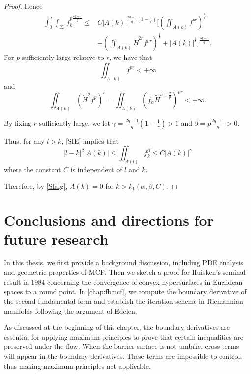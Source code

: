 \begin{proof}
    Hence
    \begin{equation*}
    \begin{split}
        \int_{0}^{T} \int_{\Sigma_t} f_{k}^{p \frac{2q-1}{q}} \leq &C \left| A(k) \right| ^{\frac{2q-1}{q}\left( 1-\frac{1}{r} \right) } [ \left( \iint_{A(k)}^{}f_{}^{pr}  \right) ^{\frac{1}{r}} \\
        &+ \left( \iint_{A(k)}^{}\tilde{H}^{2r} f_{}^{pr }  \right) ^{\frac{1}{r}}+\left| A(k) \right| ^{\frac{1}{r}} ] ^{\frac{2q-1}{q}}.
    \end{split}
    \end{equation*} 
    For $p$ sufficiently large relative to $r$, we have that 
    \[\iint_{A(k)}^{}f_{}^{pr } < + \infty \] and \[\iint_{A(k)}^{}\left( \tilde{H}^2f^p \right) ^r = \iint_{A(k)}^{}\left( f_{\alpha }\tilde{H}^{\sigma + \frac{2}{p}} \right) ^{pr}< + \infty .\]

    By fixing $r$ sufficiently large, we let $\gamma = \frac{2q-1}{q}\left( 1- \frac{1}{r} \right)>1 $ and $\beta = p \frac{2q-1}{q}>0 $.
    
    Thus, for any $l>k$, \autoref{SIE} implies that
    \[\left| l-k \right| ^{\beta }\left| A(k) \right| \leq \iint_{A(l)}^{}f_{k}^{\beta }  \leq C \left| A(k) \right| ^{\gamma }\]
    where the constant $C$ is independent of $l$ and $k$.

    Therefore, by \autoref{SIalg}, $A(k)=0$ for $k>k_1(\alpha , \beta , C)$. 
\end{proof}

\section{Conclusions and directions for future research}
In this thesis, we first provide a background discussion, including PDE analysis and geometric properties of MCF. Then we sketch a proof for Huisken's seminal result in 1984 concerning the convergence of convex hypersurfaces in Euclidean spaces to a round point. In \autoref{chap:fbmcf}, we compute the boundary derivative of the second fundamental form and establish the iteration scheme in Riemannian manifolds following the argument of Edelen.

As discussed at the beginning of this chapter, the boundary derivatives are essential for applying maximum principles to prove that certain inequalities are preserved under the flow. When the barrier surface is not umbilic, cross terms will appear in the boundary derivatives. These terms are impossible to control; thus making maximum principles not applicable. 

